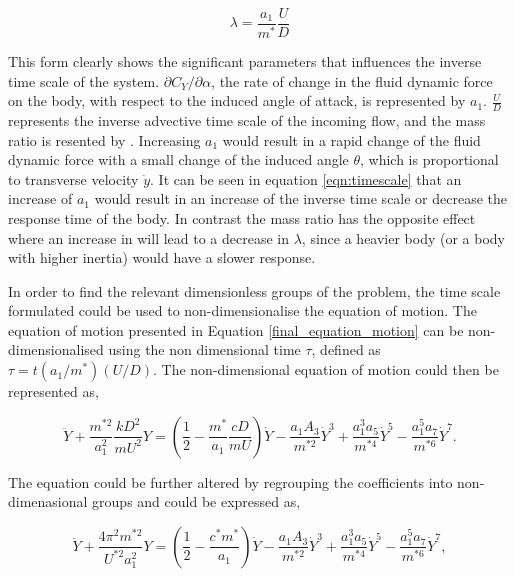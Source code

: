 \begin{equation}
\label{eqn:timescale}
\lambda = \frac{a_1}{m^*}\frac{U}{D}
\end{equation}

This form clearly shows the significant parameters that influences the inverse time scale of the system. $\partial C_Y / \partial \alpha $, the rate of change in the fluid dynamic force on the body, with respect to the induced angle of attack, is represented by $a_1$. $\frac{U}{D}$ represents the inverse advective time scale of the incoming flow, and the mass ratio is resented by \mstar. Increasing $a_1$ would result in a rapid change of the fluid dynamic force with a small change of the induced angle $\theta$, which is proportional to transverse velocity $\dot{y}$. It can be seen in equation \ref{eqn:timescale} that an increase of $a_{1}$ would result in an increase of the inverse time scale or decrease the response time of the body. In contrast the mass ratio has the opposite effect where an increase in \mstar will lead to a decrease in $\lambda$, since a heavier body (or a body with higher inertia) would have a slower response. 

In order to find the relevant dimensionless groups of the problem, the time scale formulated could be used to non-dimensionalise the equation of motion. The equation of motion presented in Equation \ref{final_equation_motion} can be non-dimensionalised using the non dimensional time $\tau$, defined as $\tau=t(a_1/m^*)(U/D)$. The non-dimensional equation of motion could then be represented as, 

 \begin{equation}
 \label{eqn:eom_nondim}
 \ddot{Y} + \frac{m^{*2}}{a_1^2}\frac{kD^2}{mU^2}Y = \left(\frac{1}{2} - \frac{m^*}{a_1}\frac{cD}{mU}\right)\dot{Y} - \frac{a_1A_3}{m^{*2}}\dot{Y}^3 + \frac{a_1^3a_5}{m^{*4}}\dot{Y}^5 - \frac{a_1^5a_7}{m^{*6}}\dot{Y}^7.
 \end{equation}
 
 The equation could be further altered by regrouping the coefficients into non-dimenasional groups and could be expressed as, 
 
  \begin{equation}
  \label{eqn:eom_nondim_regroup}
  \ddot{Y} + \frac{4\pi^{2}m^{*2}}{U^{*2}a_1^2}Y = \left(\frac{1}{2} - \frac{c^*m^*}{a_1}\right)\dot{Y} - \frac{a_1A_3}{m^{*2}}\dot{Y}^3 + \frac{a_1^3a_5}{m^{*4}}\dot{Y}^5 - \frac{a_1^5a_7}{m^{*6}}\dot{Y}^7,
  \end{equation}  

